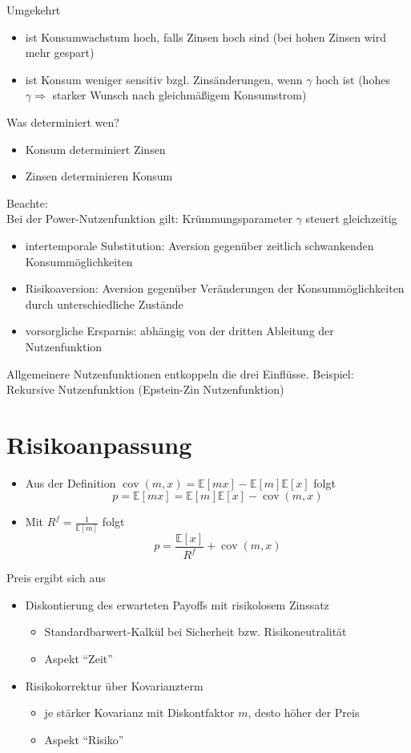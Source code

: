 \documentclass[12pt]{extreport} %
\theoremstyle{named}
\theoremstyle{nnamed}
\theoremstyle{itshape}
\theoremstyle{normal}
\begin{document}
Umgekehrt
\begin{itemize}
	\item ist Konsumwachstum hoch, falls Zinsen hoch sind (bei hohen Zinsen wird mehr gespart)
	\item ist Konsum weniger sensitiv bzgl. Zinsänderungen, wenn $\gamma$ hoch ist (hohes $\gamma \Rightarrow$ starker Wunsch nach gleichmäßigem Konsumstrom)
\end{itemize}

Was determiniert wen?
\begin{itemize}
	\item Konsum determiniert Zinsen
	\item Zinsen determinieren Konsum
\end{itemize}

Beachte: ~\\
Bei der Power-Nutzenfunktion gilt: Krümmungsparameter $\gamma$ steuert gleichzeitig
\begin{itemize}
	\item intertemporale Substitution: Aversion gegenüber zeitlich schwankenden Konsummöglichkeiten
	\item  Risikoaversion: Aversion gegenüber Veränderungen der Konsummöglichkeiten durch unterschiedliche Zustände
	\item vorsorgliche Ersparnis: abhängig von der dritten Ableitung der Nutzenfunktion
\end{itemize}
 Allgemeinere Nutzenfunktionen entkoppeln die drei Einflüsse. Beispiel: ~ Rekursive Nutzenfunktion (Epstein-Zin Nutzenfunktion) 

\section{Risikoanpassung}

\begin{itemize}
	\item Aus der Definition $\operatorname{cov}(m,x) = \mathbb{E}[mx] -  \mathbb{E}[m]  \mathbb{E}[x]$ folgt
		$$ p =  \mathbb{E}[mx] =  \mathbb{E}[m] \mathbb{E}[x] - \operatorname{cov}(m, x) $$
	\item Mit $R^f = \frac{1}{\mathbb{E}[m]}$ folgt
		$$ p = \frac{\mathbb{E}[x]}{R^f} + \operatorname{cov}(m, x) $$
\end{itemize}

Preis ergibt sich aus
\begin{itemize}
	\item Diskontierung des erwarteten Payoffs mit risikolosem Zinssatz
		\begin{itemize}
			\item Standardbarwert-Kalkül bei Sicherheit bzw. Risikoneutralität
			\item Aspekt \enquote{Zeit}
		\end{itemize}
	\item Risikokorrektur über Kovarianzterm
		\begin{itemize}
			\item je stärker Kovarianz mit Diskontfaktor $m$, desto höher der Preis
			\item Aspekt \enquote{Risiko}
		\end{itemize}
\end{itemize}
\end{document}

